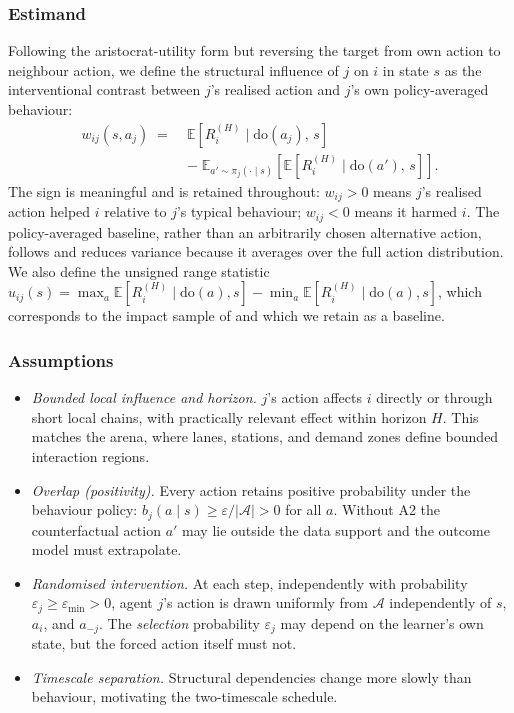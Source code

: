 \documentclass[conference]{IEEEtran}
\begin{document}
\subsubsection{Estimand}
Following the aristocrat-utility form \cite{tumer2007aristocrat} but reversing the target from own action to neighbour action, we define the structural influence of $j$ on $i$ in state $s$ as the interventional contrast between $j$'s realised action and $j$'s own policy-averaged behaviour:
\begin{equation}
\begin{aligned}
w_{ij}(s,a_j) \;=\; &\mathbb{E}\!\left[R_i^{(H)}\mid \mathrm{do}(a_j),\,s\right] \\
&-\; \mathbb{E}_{a'\sim\pi_j(\cdot\mid s)}\!\left[\mathbb{E}\!\left[R_i^{(H)}\mid \mathrm{do}(a'),\,s\right]\right].
\end{aligned}
\label{eq:estimand}
\end{equation}
The sign is meaningful and is retained throughout: $w_{ij}>0$ means $j$'s realised action helped $i$ relative to $j$'s typical behaviour; $w_{ij}<0$ means it harmed $i$. The policy-averaged baseline, rather than an arbitrarily chosen alternative action, follows \cite{foerster2018coma} and reduces variance because it averages over the full action distribution. We also define the unsigned range statistic $u_{ij}(s)=\max_a \mathbb{E}[R_i^{(H)}\mid\mathrm{do}(a),s]-\min_a \mathbb{E}[R_i^{(H)}\mid\mathrm{do}(a),s]$, which corresponds to the impact sample of \cite{pieroth2024influence} and which we retain as a baseline.

\subsubsection{Assumptions}
\begin{itemize}
\item[\textbf{A1}] \emph{Bounded local influence and horizon.} $j$'s action affects $i$ directly or through short local chains, with practically relevant effect within horizon $H$. This matches the arena, where lanes, stations, and demand zones define bounded interaction regions.
\item[\textbf{A2}] \emph{Overlap (positivity).} Every action retains positive probability under the behaviour policy: $b_j(a\mid s)\ge \varepsilon/|\mathcal{A}|>0$ for all $a$. Without A2 the counterfactual action $a'$ may lie outside the data support and the outcome model must extrapolate.
\item[\textbf{A3}] \emph{Randomised intervention.} At each step, independently with probability $\varepsilon_j\ge\varepsilon_{\min}>0$, agent $j$'s action is drawn uniformly from $\mathcal{A}$ independently of $s$, $a_i$, and $a_{-j}$. The \emph{selection} probability $\varepsilon_j$ may depend on the learner's own state, but the forced action itself must not.
\item[\textbf{A4}] \emph{Timescale separation.} Structural dependencies change more slowly than behaviour, motivating the two-timescale schedule.
\end{itemize}
\end{document}
